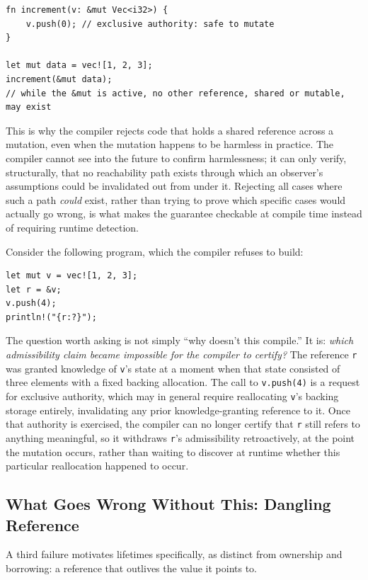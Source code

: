\documentclass[11pt]{book}
\begin{document}
\begin{lstlisting}
fn increment(v: &mut Vec<i32>) {
    v.push(0); // exclusive authority: safe to mutate
}

let mut data = vec![1, 2, 3];
increment(&mut data);
// while the &mut is active, no other reference, shared or mutable, may exist
\end{lstlisting}

This is why the compiler rejects code that holds a shared reference across a mutation, even when the mutation happens to be harmless in practice. The compiler cannot see into the future to confirm harmlessness; it can only verify, structurally, that no reachability path exists through which an observer's assumptions could be invalidated out from under it. Rejecting all cases where such a path \emph{could} exist, rather than trying to prove which specific cases would actually go wrong, is what makes the guarantee checkable at compile time instead of requiring runtime detection.

Consider the following program, which the compiler refuses to build:

\begin{lstlisting}
let mut v = vec![1, 2, 3];
let r = &v;
v.push(4);
println!("{r:?}");
\end{lstlisting}

The question worth asking is not simply ``why doesn't this compile.'' It is: \emph{which admissibility claim became impossible for the compiler to certify?} The reference \texttt{r} was granted knowledge of \texttt{v}'s state at a moment when that state consisted of three elements with a fixed backing allocation. The call to \texttt{v.push(4)} is a request for exclusive authority, which may in general require reallocating \texttt{v}'s backing storage entirely, invalidating any prior knowledge-granting reference to it. Once that authority is exercised, the compiler can no longer certify that \texttt{r} still refers to anything meaningful, so it withdraws \texttt{r}'s admissibility retroactively, at the point the mutation occurs, rather than waiting to discover at runtime whether this particular reallocation happened to occur.

\subsection*{What Goes Wrong Without This: Dangling Reference}

A third failure motivates lifetimes specifically, as distinct from ownership and borrowing: a reference that outlives the value it points to.
\end{document}
